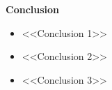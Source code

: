 \documentclass[a4paper,landscape,12pt]{extarticle}
\newif\ifshownotes
\newcommand{\speakernotes}[2]{%
  \ifshownotes
    \vfill
    \begin{tcolorbox}[
      colback=gray!8, colframe=gray!50,
      title={\textbf{Speaker: #1} --- Verbatim Script},
      fonttitle=\large, fontupper=\normalsize,
      left=6pt, right=6pt, top=4pt, bottom=4pt
    ]
    #2
    \end{tcolorbox}
  \fi
}
\begin{document}
\begin{huge}
\begin{multicols}{2}
\columnbreak

\textbf{Conclusion}
\begin{itemize}
  \item <<Conclusion 1>>
  \item <<Conclusion 2>>
  \item <<Conclusion 3>>
\end{itemize}
\end{multicols}

\leftskip 0in \rightskip 0in

\speakernotes{<<SPEAKER\_7>>}{%
<<Word-for-word conclusion speech here. End with ``Thank you ... any questions?''>>
}

\end{huge}
\end{document}
